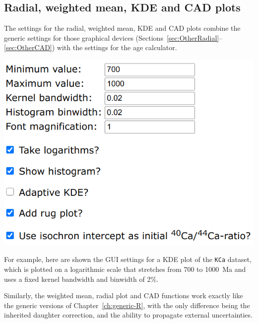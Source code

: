 \begin{refsection}
\section{Radial, weighted mean, KDE and CAD plots}
\label{sec:ArArKCaOtherPlots}

The settings for the radial, weighted mean, KDE and CAD plots combine
the generic settings for those graphical devices
(Sections~\ref{sec:OtherRadial}--\ref{sec:OtherCAD}) with the settings
for the age calculator.\\

\noindent\begin{minipage}[t]{.5\linewidth}
\strut\vspace*{-\baselineskip}\newline
\includegraphics[width=\linewidth]{../figures/KCaKDE.png}
\end{minipage}
\begin{minipage}[t]{.5\linewidth}
  For example, here are shown the GUI settings for a KDE plot of the
  \texttt{KCa} dataset, which is plotted on a logarithmic scale that
  stretches from 700 to 1000~Ma and uses a fixed kernel bandwidth and
  binwidth of 2\%.
\end{minipage}


Similarly, the weighted mean, radial plot and CAD functions work
exactly like the generic versions of Chapter~\ref{ch:generic-R}, with
the only difference being the inherited daughter correction, and the
ability to propagate external uncertainties.\\


\end{refsection}
